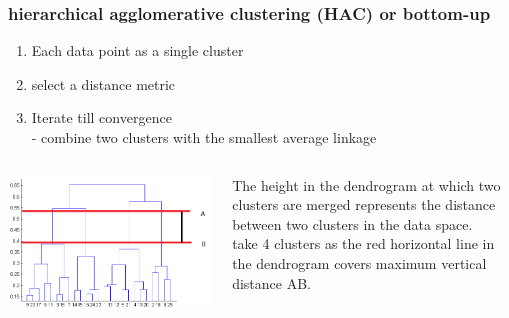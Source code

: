 \documentclass{beamer}
\begin{document}
\begin{frame}\frametitle{hierarchical agglomerative clustering (HAC) or bottom-up}

\begin{enumerate}
	\item Each data point as a single cluster
	\item select a distance metric 
	\item Iterate till convergence\\
	 - combine two clusters with the smallest average linkage
\end{enumerate}



\begin{columns}
	\begin{column}{0.3\textwidth}
		\includegraphics[scale=0.25]{hierarchical}
	\end{column}
	\begin{column}{0.65\textwidth}
		
		The height in the dendrogram at which two clusters are merged represents the distance between two clusters in the data space.\\
		take 4 clusters as the red horizontal line in the dendrogram covers maximum vertical distance AB.\\
		
		
	\end{column}
\end{columns}

\end{frame}
\end{document}
